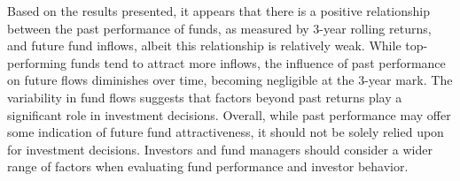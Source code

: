 \documentclass[11pt,preprint, authoryear]{elsarticle}
\numberwithin{equation}{section}
\numberwithin{figure}{section}
\numberwithin{table}{section}
\begin{document}
Based on the results presented, it appears that there is a positive
relationship between the past performance of funds, as measured by
3-year rolling returns, and future fund inflows, albeit this
relationship is relatively weak. While top-performing funds tend to
attract more inflows, the influence of past performance on future flows
diminishes over time, becoming negligible at the 3-year mark. The
variability in fund flows suggests that factors beyond past returns play
a significant role in investment decisions. Overall, while past
performance may offer some indication of future fund attractiveness, it
should not be solely relied upon for investment decisions. Investors and
fund managers should consider a wider range of factors when evaluating
fund performance and investor behavior.


\end{document}
